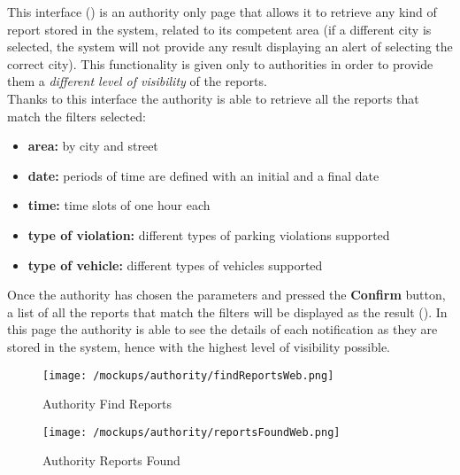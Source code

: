 				This interface () is an authority only page that allows it to retrieve any kind of report stored in the system, related to its competent area (if a different city is selected, the system will not provide any result displaying an alert of selecting the correct city). This functionality is given only to authorities in order to provide them a \emph{different level of visibility} of the reports.\\
				
				Thanks to this interface the authority is able to retrieve all the reports that match the filters selected:
				
				\begin{itemize}
					\item \textbf{area:} by city and street
					\item \textbf{date:} periods of time are defined with an initial and a final date
					\item \textbf{time:} time slots of one hour each
					\item \textbf{type of violation:} different types of parking violations supported
					\item \textbf{type of vehicle:} different types of vehicles supported
				\end{itemize} 
			
				Once the authority has chosen the parameters and pressed the \textbf{Confirm} button, a list of all the reports that match the filters will be displayed as the result (). In this page the authority is able to see the details of each notification as they are stored in the system, hence with the highest level of visibility possible.\\
				
				\newpage
				
				\begin{figure}[ht!]
					\centering
					\texttt{[image: /mockups/authority/findReportsWeb.png]}
					\caption{\label{fig:findReportsWeb} Authority Find Reports}
				\end{figure}
			
				\vspace{1cm}
			
				\begin{figure}[ht!]
					\centering
					\texttt{[image: /mockups/authority/reportsFoundWeb.png]}
					\caption{\label{fig:reportsFoundWeb} Authority Reports Found}
				\end{figure}
			
